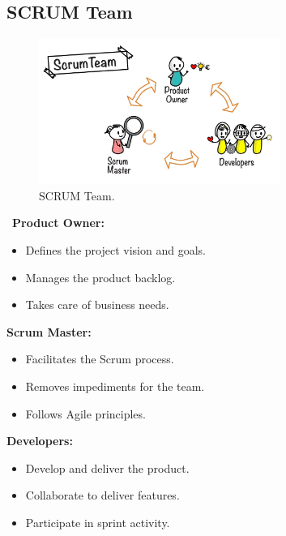 \subsection{SCRUM Team}
\begin{figure}[htbp]
    \centering
    \includegraphics[width=0.7\textwidth]{figures/Scrum Team.png} 
    \caption{SCRUM Team.}
\end{figure} \ 
\textbf{Product Owner:}
\begin{itemize}
    \item Defines the project vision and goals.
    \item Manages the product backlog.
    \item Takes care of business needs.
\end{itemize}
\textbf{Scrum Master:}
\begin{itemize}
    \item Facilitates the Scrum process.
    \item Removes impediments for the team.
    \item Follows Agile principles.
\end{itemize}
\textbf{Developers:} 
\begin{itemize}
    \item Develop and deliver the product.
    \item Collaborate to deliver features.
    \item Participate in sprint activity.
\end{itemize}
